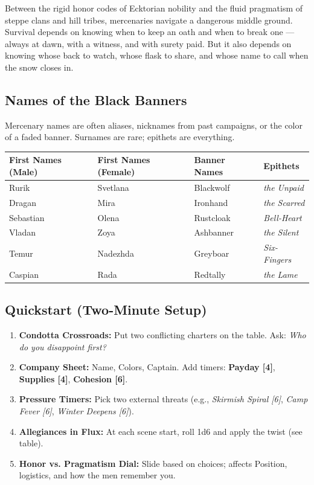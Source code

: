 Between the rigid honor codes of Ecktorian nobility and the fluid pragmatism of steppe clans and hill tribes, mercenaries navigate a dangerous middle ground. Survival depends on knowing when to keep an oath and when to break one --- always at dawn, with a witness, and with surety paid. But it also depends on knowing whose back to watch, whose flask to share, and whose name to call when the snow closes in.

\subsection*{Names of the Black Banners}
Mercenary names are often aliases, nicknames from past campaigns, or the color of a faded banner. Surnames are rare; epithets are everything.

\begin{longtable}{|p{}|p{}|p{}|p{}|}
\hline
\textbf{First Names (Male)} & \textbf{First Names (Female)} & \textbf{Banner Names} & \textbf{Epithets} \\
\hline
Rurik & Svetlana & Blackwolf & \textit{the Unpaid} \\
\hline
Dragan & Mira & Ironhand & \textit{the Scarred} \\
\hline
Sebastian & Olena & Rustcloak & \textit{Bell-Heart} \\
\hline
Vladan & Zoya & Ashbanner & \textit{the Silent} \\
\hline
Temur & Nadezhda & Greyboar & \textit{Six-Fingers} \\
\hline
Caspian & Rada & Redtally & \textit{the Lame} \\
\hline
\end{longtable}

\subsection*{Quickstart (Two-Minute Setup)}
\label{sec:black-banners-quickstart}

\begin{enumerate}[leftmargin=*]
    \item \textbf{Condotta Crossroads:} Put two conflicting charters on the table. Ask: \textit{Who do you disappoint first?}
    \item \textbf{Company Sheet:} Name, Colors, Captain. Add timers: \textbf{Payday [4]}, \textbf{Supplies [4]}, \textbf{Cohesion [6]}.
    \item \textbf{Pressure Timers:} Pick two external threats (e.g., \textit{Skirmish Spiral [6]}, \textit{Camp Fever [6]}, \textit{Winter Deepens [6]}).
    \item \textbf{Allegiances in Flux:} At each scene start, roll 1d6 and apply the twist (see table).
    \item \textbf{Honor vs. Pragmatism Dial:} Slide based on choices; affects Position, logistics, and how the men remember you.
\end{enumerate}

